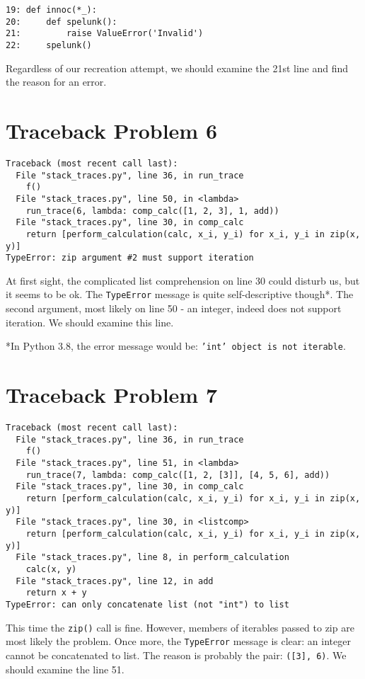 \documentclass[8pt, a4paper]{article}
\begin{document}
\begin{verbatim}
19: def innoc(*_):
20:     def spelunk():
21:         raise ValueError('Invalid')
22:     spelunk()
\end{verbatim}

Regardless of our recreation attempt, we should examine the 21st line and find the reason for an error.

\section*{Traceback Problem 6}
\begin{verbatim}
Traceback (most recent call last):
  File "stack_traces.py", line 36, in run_trace
    f()
  File "stack_traces.py", line 50, in <lambda>
    run_trace(6, lambda: comp_calc([1, 2, 3], 1, add))
  File "stack_traces.py", line 30, in comp_calc
    return [perform_calculation(calc, x_i, y_i) for x_i, y_i in zip(x, y)]
TypeError: zip argument #2 must support iteration
\end{verbatim}

At first sight, the complicated list comprehension on line 30 could disturb us, but it seems to be ok. The \texttt{TypeError} message is quite self-descriptive though*. The second argument, most likely on line 50 - an integer, indeed does not support iteration. We should examine this line.

*In Python 3.8, the error message would be: \texttt{'int' object is not iterable}.

\section*{Traceback Problem 7}
\begin{verbatim}
Traceback (most recent call last):
  File "stack_traces.py", line 36, in run_trace
    f()
  File "stack_traces.py", line 51, in <lambda>
    run_trace(7, lambda: comp_calc([1, 2, [3]], [4, 5, 6], add))
  File "stack_traces.py", line 30, in comp_calc
    return [perform_calculation(calc, x_i, y_i) for x_i, y_i in zip(x, y)]
  File "stack_traces.py", line 30, in <listcomp>
    return [perform_calculation(calc, x_i, y_i) for x_i, y_i in zip(x, y)]
  File "stack_traces.py", line 8, in perform_calculation
    calc(x, y)
  File "stack_traces.py", line 12, in add
    return x + y
TypeError: can only concatenate list (not "int") to list
\end{verbatim}

This time the \texttt{zip()} call is fine. However, members of iterables passed to zip are most likely the problem. Once more, the \texttt{TypeError} message is clear: an integer cannot be concatenated to list. The reason is probably the pair: \texttt{([3], 6)}. We should examine the line 51.
\end{document}
